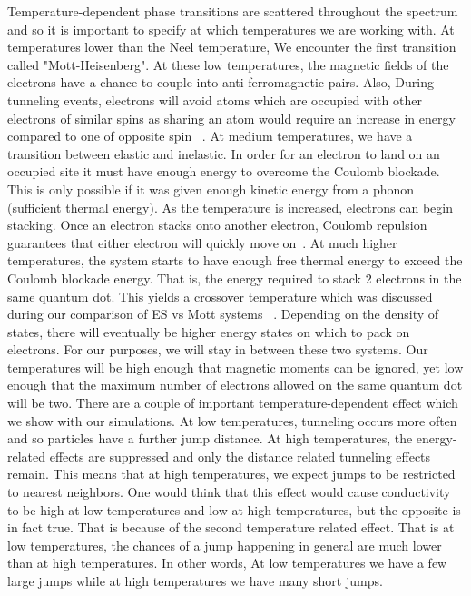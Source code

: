 Temperature-dependent phase transitions are scattered throughout the spectrum and so it is important to specify at which temperatures we are working with. At temperatures lower than the Neel temperature, We encounter the first transition called "Mott-Heisenberg". At these low temperatures, the magnetic fields of the electrons have a chance to couple into anti-ferromagnetic pairs. Also, During tunneling events, electrons will avoid atoms which are occupied with other electrons of similar spins as sharing an atom would require an increase in energy compared to one of opposite spin ~\cite{Gebhard03}. At medium temperatures, we have a transition between elastic and inelastic. In order for an electron to land on an occupied site it must have enough energy to overcome the Coulomb blockade. This is only possible if it was given enough kinetic energy from a phonon (sufficient thermal energy). As the temperature is increased, electrons can begin stacking. Once an electron stacks onto another electron, Coulomb repulsion guarantees that either electron will quickly move on~\cite{Glazman05}. At much higher temperatures, the system starts to have enough free thermal energy to exceed the Coulomb blockade energy. That is, the energy required to stack 2 electrons in the same quantum dot. This yields a crossover temperature which was discussed during our comparison of ES vs Mott systems ~\cite{aharony92}. Depending on the density of states, there will eventually be higher energy states on which to pack on electrons. For our purposes, we will stay in between these two systems. Our temperatures will be high enough that magnetic moments can be ignored, yet low enough that the maximum number of electrons allowed on the same quantum dot will be two. There are a couple of important temperature-dependent effect which we show with our simulations. At low temperatures, tunneling occurs more often and so particles have a further jump distance. At high temperatures, the energy-related effects are suppressed and only the distance related tunneling effects remain. This means that at high temperatures, we expect jumps to be restricted to nearest neighbors. One would think that this effect would cause conductivity to be high at low temperatures and low at high temperatures, but the opposite is in fact true. That is because of the second temperature related effect. That is at low temperatures, the chances of a jump happening in general are much lower than at high temperatures. In other words, At low temperatures we have a few large jumps while at high temperatures we have many short jumps.

